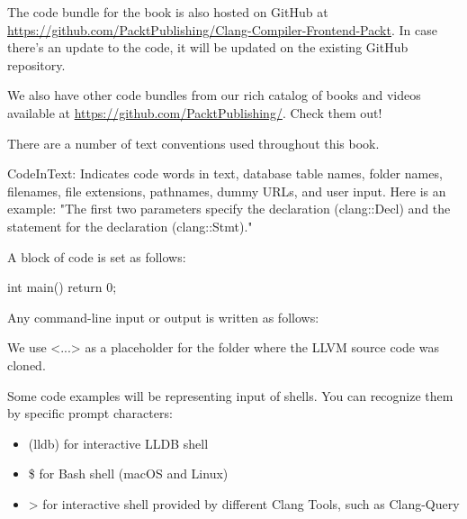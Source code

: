 
The code bundle for the book is also hosted on GitHub at \url{https://github.com/PacktPublishing/Clang-Compiler-Frontend-Packt}. In case there's an update to the code, it will be updated on the existing GitHub repository.

We also have other code bundles from our rich catalog of books and videos available at \url{https://github.com/PacktPublishing/}. Check them out!



There are a number of text conventions used throughout this book.

CodeInText: Indicates code words in text, database table names, folder names, filenames, file extensions, pathnames, dummy URLs, and user input. Here is an example: "The first two parameters specify the declaration (clang::Decl) and the statement for the declaration (clang::Stmt)."

A block of code is set as follows:

\begin{cpp}
int main() {
  return 0;
 }
\end{cpp}

Any command-line input or output is written as follows:


We use <...> as a placeholder for the folder where the LLVM source code was cloned.

Some code examples will be representing input of shells. You can recognize them by specific prompt characters:


\begin{itemize}
\item
(lldb) for interactive LLDB shell

\item
\$ for Bash shell (macOS and Linux)

\item
> for interactive shell provided by different Clang Tools, such as Clang-Query
\end{itemize}




